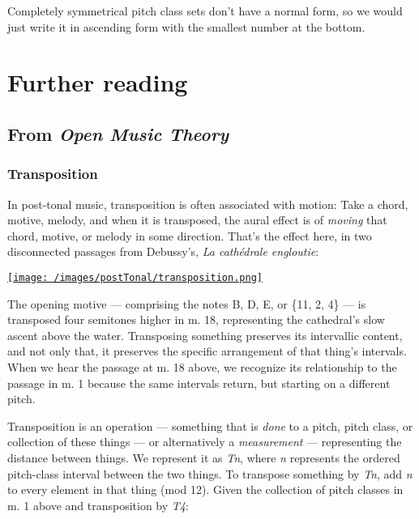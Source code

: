 \documentclass{book}
\begin{document}
Completely symmetrical pitch class sets don't have a normal form, so we would
just write it in ascending form with the smallest number at the bottom.

\hypertarget{further-reading-8}{%
\chapter{Further reading}\label{further-reading-8}}

\hypertarget{from-open-music-theory-9}{%
\section{\texorpdfstring{From \emph{Open Music
Theory}}{From Open Music Theory}}\label{from-open-music-theory-9}}

\hypertarget{transposition-1}{%
\subsection{Transposition}\label{transposition-1}}

In post-tonal music, transposition is often associated with motion: Take a
chord, motive, melody, and when it is transposed, the aural effect is of
\emph{moving} that chord, motive, or melody in some direction. That's the
effect here, in two disconnected passages from Debussy's, \emph{La cathédrale
engloutie}:

\href{/images/postTonal/transposition.png}{\texttt{[image: /images/postTonal/transposition.png]}}

The opening motive --- comprising the notes B, D, E, or \{11, 2, 4\} --- is
transposed four semitones higher in m. 18, representing the cathedral's slow
ascent above the water. Transposing something preserves its intervallic
content, and not only that, it preserves the specific arrangement of that
thing's intervals. When we hear the passage at m. 18 above, we recognize its
relationship to the passage in m. 1 because the same intervals return, but
starting on a different pitch.

Transposition is an operation --- something that is \emph{done} to a pitch,
pitch class, or collection of these things --- or alternatively a
\emph{measurement} --- representing the distance between things. We represent
it as \emph{Tn}, where \emph{n} represents the ordered pitch-class interval
between the two things. To transpose something by \emph{Tn}, add \emph{n} to
every element in that thing (mod 12). Given the collection of pitch classes in
m. 1 above and transposition by \emph{T4}:
\end{document}
